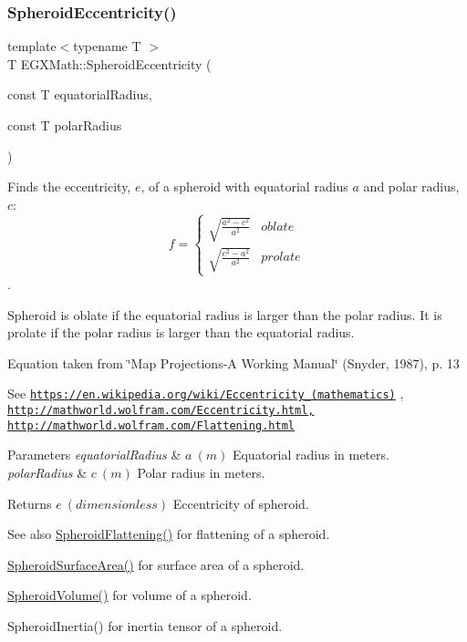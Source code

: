 \subsubsection{\texorpdfstring{Spheroid\+Eccentricity()}{SpheroidEccentricity()}\hspace{0.1cm}{\footnotesize\ttfamily [2/2]}}
{\footnotesize\ttfamily template$<$typename T $>$ \\
T E\+G\+X\+Math\+::\+Spheroid\+Eccentricity (\begin{DoxyParamCaption}\item[{const T}]{equatorial\+Radius,  }\item[{const T}]{polar\+Radius }\end{DoxyParamCaption})}



Finds the eccentricity, $e$, of a spheroid with equatorial radius $a$ and polar radius, $c$\+: \[ f =\begin{cases} \sqrt{\frac{a^2-c^2}{a^2}} & oblate \\ \sqrt{\frac{c^2-a^2}{a^2}} & prolate \end{cases} \]. 

Spheroid is oblate if the equatorial radius is larger than the polar radius. It is prolate if the polar radius is larger than the equatorial radius.

Equation taken from \char`\"{}\+Map Projections-\/\+A Working Manual\char`\"{} (Snyder, 1987), p. 13

See \href{https://en.wikipedia.org/wiki/Eccentricity_(mathematics)}{\tt https\+://en.\+wikipedia.\+org/wiki/\+Eccentricity\+\_\+(mathematics)} , \href{http://mathworld.wolfram.com/Eccentricity.html,}{\tt http\+://mathworld.\+wolfram.\+com/\+Eccentricity.\+html,} \href{http://mathworld.wolfram.com/Flattening.html}{\tt http\+://mathworld.\+wolfram.\+com/\+Flattening.\+html} 
\begin{DoxyParams}{Parameters}
{\em equatorial\+Radius} & $ a\ (m)$ Equatorial radius in meters. \\
\hline
{\em polar\+Radius} & $ c\ (m)$ Polar radius in meters. \\
\hline
\end{DoxyParams}
\begin{DoxyReturn}{Returns}
$ e\ (dimensionless)$ Eccentricity of spheroid. 
\end{DoxyReturn}
\begin{DoxySeeAlso}{See also}
\mbox{\hyperlink{group___e_g_x_math-_geometry-3_d-_spheroid-_flattening_ga640f4bcd86aa4c378819bffda31c0852}{Spheroid\+Flattening()}} for flattening of a spheroid. 

\mbox{\hyperlink{group___e_g_x_math-_geometry-3_d-_spheroid-_surface_area_ga32a21d075102ea9a235a43165675627e}{Spheroid\+Surface\+Area()}} for surface area of a spheroid. 

\mbox{\hyperlink{group___e_g_x_math-_geometry-3_d-_spheroid-_volume_gac89ed1e10e56c724b341591ecc5605dc}{Spheroid\+Volume()}} for volume of a spheroid. 

Spheroid\+Inertia() for inertia tensor of a spheroid. 
\end{DoxySeeAlso}
